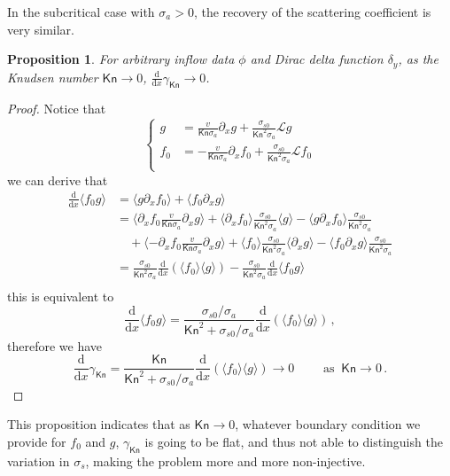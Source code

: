 \documentclass[english,reqno]{amsart}
\theoremstyle{plain}
\newtheorem{proposition}{Proposition}
\theoremstyle{definition} %
\newcommand{\rd}{\mathrm{d}}
\newcommand{\Kn}{\mathsf{Kn}}
\begin{document}
In the subcritical case with $\sigma_a >0$, the recovery of the scattering coefficient is very similar.
\begin{proposition}\label{prop:RTE_sca2}
For arbitrary inflow data $\phi$ and Dirac delta function $\delta_y$, as the Knudsen number $\Kn \rightarrow 0$, $\frac{\rd}{\rd x}\gamma_\Kn \rightarrow 0$.
\end{proposition}
\begin{proof}
Notice that
\[
\begin{cases}
g&=\frac{v}{\Kn \sigma_a}\partial_x g+\frac{\sigma_{s0}}{\Kn^2\sigma_a}\mathcal{L}g\\
f_0&=-\frac{v}{\Kn \sigma_a} \partial_x f_0+\frac{\sigma_{s0}}{ \Kn^2 \sigma_a}\mathcal{L}f_0\\
\end{cases}
\]
we can derive that
\[
\begin{aligned}
\frac{\rd}{\rd x}\langle f_0 g\rangle&=\langle g\partial_xf_0\rangle+\langle f_0\partial_x g\rangle\\
&=\langle \partial_xf_0\frac{v}{\Kn\sigma_a}\partial_xg\rangle +\langle \partial_xf_0\rangle \frac{\sigma_{s0}}{\Kn^2 \sigma_a}\langle g\rangle -\langle g\partial_xf_0\rangle \frac{\sigma_{s0}}{\Kn^2\sigma_a}\\
&\quad +\langle -\partial_xf_0\frac{v}{\Kn\sigma_a}\partial_xg\rangle +\langle f_0\rangle \frac{\sigma_{s0}}{\Kn^2 \sigma_a}\langle \partial_x g\rangle -\langle f_0\partial_xg\rangle \frac{\sigma_{s0}}{\Kn^2 \sigma_a}\\
&=\frac{\sigma_{s0}}{\Kn^2\sigma_a}\frac{\rd}{\rd x}(\langle f_0\rangle \langle g\rangle)-\frac{\sigma_{s0}}{\Kn^2\sigma_a}\frac{\rd}{\rd x}\langle f_0g\rangle\\
\end{aligned}
\]
this is equivalent to
\[
\frac{\rd}{\rd x}\langle f_0 g\rangle =\frac{\sigma_{s0}/\sigma_a}{\Kn^2+\sigma_{s0}/\sigma_a}\frac{\rd}{\rd x}(\langle f_0 \rangle\langle g\rangle)\,,
\]
therefore we have
\[
\frac{\rd}{\rd x}\gamma_\Kn =\frac{\Kn}{\Kn^2+\sigma_{s0}/\sigma_a}\frac{\rd}{\rd x}(\langle f_0\rangle \langle g\rangle) \rightarrow 0 \qquad \text{ as } ~\Kn \rightarrow 0\,.
\]
\end{proof}

This proposition indicates that as $\Kn\to 0$, whatever boundary condition we provide for $f_0$ and $g$, $\gamma_\Kn$ is going to be flat, and thus not able to distinguish the variation in $\sigma_s$, making the problem more and more non-injective.
\end{document}
